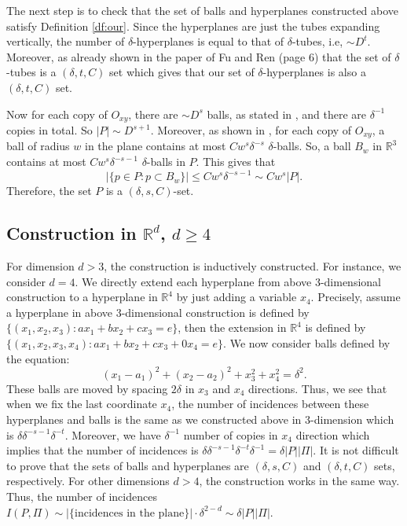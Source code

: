 \documentclass[11pt]{article}
\newcommand{\1}{\mathbf{1}}
\begin{document}
The next step is to check that the set of balls and hyperplanes constructed above satisfy Definition \ref{df:our}. Since the hyperplanes are just the tubes expanding vertically, the number of $\delta$-hyperplanes is equal to that of $\delta$-tubes, i.e, $\sim D^t$. Moreover, as already shown in the paper of Fu and Ren \cite{FuRen} (page 6) that the set of $\delta$-tubes is a $(\delta, t, C)$ set which gives that our set of $\delta$-hyperplanes is also a $(\delta, t, C)$ set.

Now for each copy of $O_{xy}$, there are $\sim D^{s}$ balls, as stated in \cite{FuRen}, and there are $\delta^{-1}$ copies in total. So $|P| \sim D^{s+1}$. Moreover, as shown in \cite{FuRen}, for each copy of $O_{xy}$, a ball of radius $w$ in the plane contains at most $Cw^{s}\delta^{-s}$ $\delta$-balls. So, a ball $B_w$ in $\mathbb R^3$ contains at most $Cw^{s}\delta^{-s-1}$ $\delta$-balls in $P$. This gives that
\[|\{p \in P: p \subset B_w\}| \le C w^{s}\delta^{-s-1}\sim Cw^{s}|P|.\]
Therefore, the set $P$ is a $(
    \delta,s,C)$-set.
\subsection{Construction in $\mathbb{R}^d$, $d\ge 4$}
For dimension $d>3$, the construction is inductively constructed. For instance, we consider $d=4$. We directly extend each hyperplane from above 3-dimensional construction to a hyperplane in $\mathbb R^4$ by just adding a variable $x_4$. Precisely, assume a hyperplane in above 3-dimensional construction is defined by $\{(x_1, x_2, x_3): ax_1+bx_2+cx_3=e\}$, then the extension in $\mathbb{R}^4$ is defined by $\{(x_1, x_2, x_3, x_4): ax_1+bx_2+cx_3 +0x_4=e\}.$ We now consider balls defined by the equation:
\[ (x_1-a_1)^2 +(x_2-a_2)^2+x_3^2+x_4^2=\delta^2.\]
These balls are moved by spacing $2\delta$ in $x_3$ and $x_4$ directions. Thus, we see that when we fix the last coordinate $x_4$, the number of incidences between these hyperplanes and balls is the same as we constructed above in 3-dimension which is $\delta \delta^{-s-1} \delta^{-t}$. Moreover, we have $\delta^{-1}$ number of copies in $x_4$ direction which implies that the number of incidences is $ \delta \delta^{-s-1} \delta^{-t} \delta^{-1} =\delta |P||\Pi|$. It is not difficult to prove that the sets of balls and hyperplanes are $(\delta, s, C)$ and $(\delta, t, C)$ sets, respectively. For other dimensions $d > 4$, the construction works in the same way. Thus, the number of incidences
$I(P,\Pi) \sim |\{\text{incidences in the plane}\}|\cdot \delta^{2-d} \sim \delta |P||\Pi|$.
\end{document}
